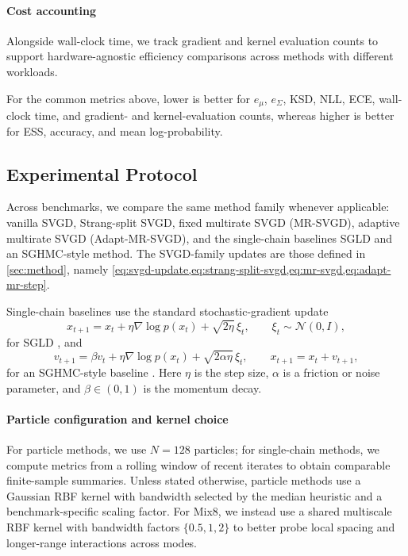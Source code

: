 \paragraph{Cost accounting}
Alongside wall-clock time, we track gradient and kernel evaluation counts to
support hardware-agnostic efficiency comparisons across methods with different workloads.

\begin{remark}
For the common metrics above, lower is better for $e_\mu$, $e_\Sigma$, KSD,
NLL, ECE, wall-clock time, and gradient- and kernel-evaluation counts,
whereas higher is better for ESS, accuracy, and mean log-probability.
\end{remark}



\subsection{Experimental Protocol}

Across benchmarks, we compare the same method family whenever applicable:
vanilla SVGD, Strang-split SVGD, fixed multirate SVGD (MR-SVGD), adaptive
multirate SVGD (Adapt-MR-SVGD), and the single-chain baselines SGLD and an
SGHMC-style method. The SVGD-family updates are those defined in
\cref{sec:method}, namely
\cref{eq:svgd-update,eq:strang-split-svgd,eq:mr-svgd,eq:adapt-mr-step}.

Single-chain baselines use the standard stochastic-gradient update
\begin{equation}
x_{t+1}=x_t+\eta\nabla \log p(x_t)+\sqrt{2\eta}\,\xi_t,\qquad \xi_t\sim\mathcal{N}(0,I),
\label{eq:sgld-update}
\end{equation}
for SGLD \cite{welling2011sgld}, and
\begin{equation}
v_{t+1}=\beta v_t+\eta\nabla \log p(x_t)+\sqrt{2\alpha\eta}\,\xi_t,\qquad x_{t+1}=x_t+v_{t+1},
\label{eq:sghmc-update}
\end{equation}
for an SGHMC-style baseline \cite{chen2014sghmc}. Here $\eta$ is the step
size, $\alpha$ is a friction or noise parameter, and $\beta\in(0,1)$ is the
momentum decay.

\paragraph{Particle configuration and kernel choice}
For particle methods, we use $N=128$ particles; for single-chain methods, we
compute metrics from a rolling window of recent iterates to obtain comparable
finite-sample summaries. Unless stated otherwise, particle methods use a
Gaussian RBF kernel with bandwidth selected by the median heuristic and a
benchmark-specific scaling factor. For Mix8, we instead use a shared
multiscale RBF kernel with bandwidth factors $\{0.5,1,2\}$ to better probe
local spacing and longer-range interactions across modes.

